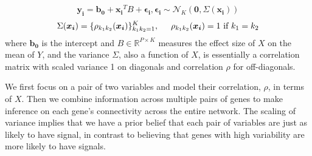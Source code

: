 \documentclass[12pt]{article}
\theoremstyle{theorem}
\begin{document}
\begin{equation}
\bm{y_i} = \bm{b_0} + \bm{x_i}^TB + \bm{\epsilon_i}, \bm{\epsilon_i} \sim \mathcal{N}_K(\bm{0}, \Sigma(\bm{x_i}))
\label{eq1}
\end{equation}
$$\Sigma (\bm{x_i}) = \{\rho_{k_1k_2}(\bm{x_i})\}_{k_1k_2 = 1}^K, \hspace{5mm} \rho_{k_1k_2}(\bm{x_i}) = 1 \text{  if  } k_1 = k_2$$
where $\bm{b_0}$ is the intercept and $B\in \mathbb{R}^{P \times K}$ measures the effect size of $X$ on the mean of $Y$, and the variance $\Sigma$, also a function of $X$, is essentially a correlation matrix with scaled variance 1 on diagonals and correlation $\rho$ for off-diagonals. 

\vspace{5mm} \noindent
We first focus on a pair of two variables and model their correlation, $\rho$, in terms of $X$. Then we combine information across multiple pairs of genes to make inference on each gene's connectivity across the entire network. The scaling of variance implies that we have a prior belief that each pair of variables are just as likely to have signal, in contrast to believing that genes with high variability are more likely to have signals.
\end{document}
